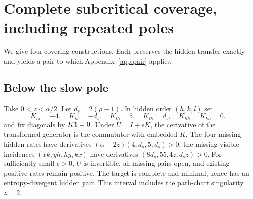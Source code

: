 \section{Complete subcritical coverage, including repeated poles}\label{app:subcritical}
We give four covering constructions. Each preserves the hidden transfer exactly and yields a pair to which Appendix~\ref{app:pair} applies.

\subsection{Below the slow pole}
Take $0<z<\alpha/2$. Let $d_s=2(\rho-1)$. In hidden order $(h,k,l)$ set
\begin{equation}
 K_{hl}=-4,\quad K_{kl}=-d_s,\quad K_{lh}=5,\quad K_{lk}=d_s,\quad
 K_{hk}=K_{kh}=0,
\end{equation}
and fix diagonals by $K\mathbf 1=0$. Under $U=I+\epsilon K$, the derivative of the transformed generator is the commutator with embedded $K$. The four missing hidden rates have derivatives $(\alpha-2z)(4,d_s,5,d_s)>0$; the missing visible incidences $(xk,yh,hy,kx)$ have derivatives $(8d_s,55,4z,d_sz)>0$. For sufficiently small $\epsilon>0$, $U$ is invertible, all missing pairs open, and existing positive rates remain positive. The target is complete and minimal, hence has an entropy-divergent hidden pair. This interval includes the path-chart singularity $z=2$.


